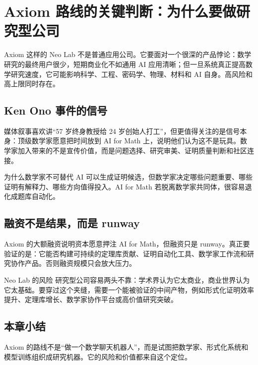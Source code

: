 \section{Axiom 路线的关键判断：为什么要做研究型公司}

Axiom 这样的 Neo Lab 不是普通应用公司。它要面对一个很深的产品悖论：数学研究的最终用户很少，短期商业化不如通用 AI 应用清晰；但一旦系统真正提高数学研究速度，它可能影响科学、工程、密码学、物理、材料和 AI 自身。高风险和高上限同时存在。

\subsection{Ken Ono 事件的信号}

媒体叙事喜欢讲“57 岁终身教授给 24 岁创始人打工”，但更值得关注的是信号本身：顶级数学家愿意把时间放到 AI for Math 上，说明他们认为这不是玩具。数学家加入带来的不是宣传价值，而是问题选择、研究审美、证明质量判断和社区连接。

\begin{importantbox}{为什么数学家不可替代}
AI 可以生成证明候选，但数学家决定哪些问题重要、哪些证明有解释力、哪些方向值得投入。AI for Math 若脱离数学家共同体，很容易退化成题库自动化。
\end{importantbox}

\subsection{融资不是结果，而是 runway}

Axiom 的大额融资说明资本愿意押注 AI for Math，但融资只是 runway。真正要验证的是：它能否构建可持续的定理库贡献、证明自动化工具、数学家工作流和研究协作产品。否则融资规模只会放大压力。

\begin{warningbox}{Neo Lab 的风险}
研究型公司容易两头不靠：学术界认为它太商业，商业世界认为它太基础。要穿过这个夹缝，需要一个能被验证的中间产物，例如形式化证明效率提升、定理库增长、数学家协作平台或高价值研究突破。
\end{warningbox}

\subsection{本章小结}

Axiom 的路线不是“做一个数学聊天机器人”，而是试图把数学家、形式化系统和模型训练组织成研究机器。它的风险和价值都来自这个定位。

